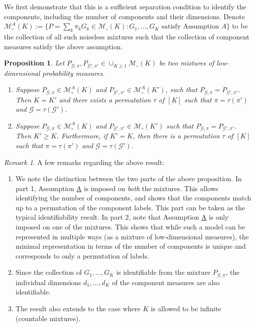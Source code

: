 \documentclass[bj,authoryear]{imsart}
\theoremstyle{plain}
\newtheorem{proposition}{Proposition}
\theoremstyle{remark}
\newtheorem{remark}{Remark}
\def\cG{\mathcal{G}}
\def\cM{\mathcal{M}}
\begin{document}
We first demonstrate that this is a sufficient separation condition to identify the components, including the number of components and their dimensions. Denote $\cM_\circ^A(K):=\{P=\sum_k\pi_kG_k\in \cM_\circ(K): G_1,\dots,G_K \text{ satisfy Assumption } \hyperref[assume:A]{A}\}$ to be the collection of all such noiseless mixtures such that the collection of component measures satisfy the above assumption.

\begin{proposition}\label{prop:noiseless_identifiability}
Let $P_{\cG,\pi}, P_{\cG',\pi'}\in \cup_{K\geq 1} \cM_\circ(K)$ be two mixtures of low-dimensional probability measures.
\begin{enumerate}
    \item Suppose $P_{\cG,\pi}\in \cM_{\circ}^A(K)$ and $P_{\cG',\pi'}\in \cM_\circ^A(K')$, such that $P_{\cG,\pi}=P_{\cG',\pi'}$. Then $K=K'$ and there exists a permutation $\tau$ of $[K]$ such that $\pi=\tau(\pi')$ and $\cG=\tau(\cG')$.
    \item Suppose $P_{\cG,\pi}\in \cM_\circ^A(K)$ and $P_{\cG',\pi'}\in \cM_\circ(K')$ such that $P_{\cG,\pi}=P_{\cG',\pi'}$. Then $K'\geq K$. Furthermore, if $K'=K$, then there is a permutation $\tau$ of $[K]$ such that $\pi=\tau(\pi')$ and $\cG=\tau(\cG')$.
\end{enumerate}
\end{proposition}

\begin{remark} A few remarks regarding the above result:
\begin{enumerate}
    \item We note the distinction between the two parts of the above proposition. In part 1, Assumption \hyperref[assume:A]{A} is imposed on \textit{both} the mixtures. This allows identifying the number of components, and shows that the components match up to a permutation of the component labels. This part can be taken as the typical identifiability result. In part 2, note that Assumption \hyperref[assume:A]{A} is only imposed on one of the mixtures. This shows that while such a model can be represented in multiple ways (as a mixture of low-dimensional measures), the minimal representation in terms of the number of components is unique and corresponds to only a permutation of labels. 
    \item Since the collection of $G_1,\dots,G_K$ is identifiable from the mixture $P_{\cG,\pi}$, the individual dimensions $d_1,\dots,d_K$ of the component measures are also identifiable.
    \item The result also extends to the case where $K$ is allowed to be infinite (countable mixtures). 
\end{enumerate}
\end{remark}
\end{document}
